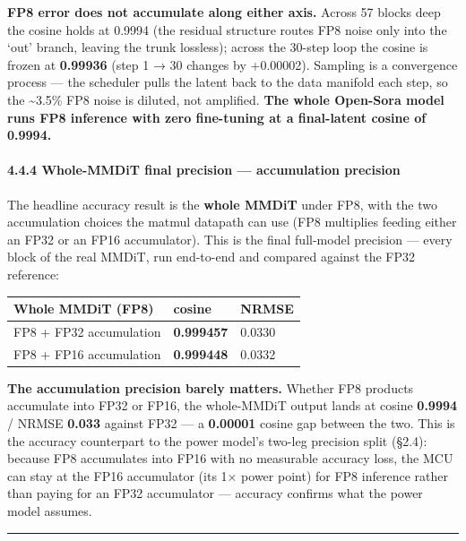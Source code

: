 \documentclass[
  10pt,
]{article}
\newcounter{none} %
\begin{document}
\textbf{FP8 error does not accumulate along either axis.} Across 57 blocks
deep the cosine holds at 0.9994 (the residual structure routes FP8 noise
only into the `out' branch, leaving the trunk lossless); across the 30-step
loop the cosine is frozen at \textbf{0.99936} (step 1 → 30 changes by
+0.00002). Sampling is a convergence process — the scheduler pulls the
latent back to the data manifold each step, so the \textasciitilde3.5\% FP8
noise is diluted, not amplified. \textbf{The whole Open-Sora model runs
FP8 inference with zero fine-tuning at a final-latent cosine of 0.9994.}

\paragraph{4.4.4 Whole-MMDiT final precision --- accumulation
precision}\label{whole-mmdit-precision}

The headline accuracy result is the \textbf{whole MMDiT} under FP8, with the
two accumulation choices the matmul datapath can use (FP8 multiplies feeding
either an FP32 or an FP16 accumulator). This is the final full-model
precision — every block of the real MMDiT, run end-to-end and compared
against the FP32 reference:

{\def\LTcaptype{none}
\begin{longtable}[]{@{}lll@{}}
\toprule\noalign{}
Whole MMDiT (FP8) & cosine & NRMSE \\
\midrule\noalign{}
\endhead
\bottomrule\noalign{}
\endlastfoot
FP8 + FP32 accumulation & \textbf{0.999457} & 0.0330 \\
FP8 + FP16 accumulation & \textbf{0.999448} & 0.0332 \\
\end{longtable}
}

\textbf{The accumulation precision barely matters.} Whether FP8 products
accumulate into FP32 or FP16, the whole-MMDiT output lands at cosine
\textbf{0.9994} / NRMSE \textbf{0.033} against FP32 — a \textbf{0.00001}
cosine gap between the two. This is the accuracy counterpart to the power
model's two-leg precision split (§2.4): because FP8 accumulates into FP16
with no measurable accuracy loss, the MCU can stay at the FP16 accumulator
(its 1× power point) for FP8 inference rather than paying for an FP32
accumulator — accuracy confirms what the power model assumes.

\begin{center}\rule{0.5\linewidth}{0.5pt}\end{center}
\end{document}
